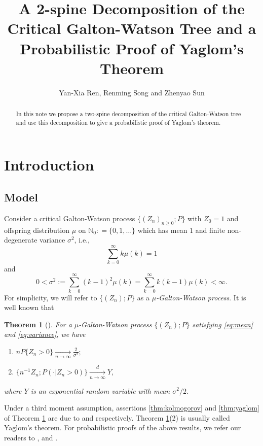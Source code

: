\documentclass[12pt,a4paper]{amsart}
\title[A 2-spine decomposition and Yaglom's theorem]
{\large A 2-spine Decomposition of the Critical Galton-Watson Tree and a Probabilistic Proof of Yaglom's Theorem}
\author{Yan-Xia Ren, Renming Song and Zhenyao Sun}
\newtheorem{thm}{Theorem}[section]
\numberwithin{equation}{section}
\begin{document}
\begin{abstract}
	In this note  we propose a two-spine decomposition of the critical Galton-Watson tree and use this decomposition to give a probabilistic proof of Yaglom's theorem.
\end{abstract}
\maketitle	
\section{Introduction}
\subsection{Model}
\label{sec:model}
	Consider a critical Galton-Watson process 
	$\{(Z_n)_{n\ge 0}; P \}$ with $Z_0 = 1$ 
	and offspring distribution $\mu$ on $\mathbb N_0 : = \{0,1,\dots\}$ which has mean $1$ and finite non-degenerate variance $\sigma^2$, i.e.,
\begin{equation}\label{eq:mean}
 \sum_{k=0}^\infty k \mu(k)	=1
\end{equation}
	and
\begin{equation}\label{eq:variance}
	0	
	<	\sigma^2
	:=	\sum_{k=0}^\infty  (k-1)^2 \mu(k)
	=	\sum_{k=0}^\infty k(k-1) \mu(k)
	<	\infty.
\end{equation}
	For simplicity, we will refer to $\{(Z_n); P\}$ as  a  \emph{$\mu$-Galton-Watson process}.
	It is well known that
\begin{thm}[\cite{kesten1966galton}] \label{thm: Kolmogrov and Yaglom theorem}
	For a $\mu$-Galton-Watson process $\{(Z_n); P\}$ satisfying \eqref{eq:mean} and \eqref{eq:variance}, we have
\begin{enumerate}
\item \label{thm:kolmogorov}
	$n P \{Z_n>0\} \xrightarrow[n \to \infty]{} \frac{2}{\sigma^2};$
\item \label{thm:yaglom}
	$\{n^{-1}Z_n; P(\cdot | Z_n>0)\}\xrightarrow[n \to \infty]{d} Y,$
\end{enumerate}
	where $Y$ is an exponential random variable with mean $\sigma^2/2$.
\end{thm}

	Under a third moment assumption, assertions \eqref{thm:kolmogorov} and \eqref{thm:yaglom} of Theorem \ref{thm: Kolmogrov and Yaglom theorem} are due to \cite{kolmogorov1938losung} and \cite{yaglom1947certain} respectively.
	Theorem \ref{thm: Kolmogrov and Yaglom theorem}(2) is usually called Yaglom's theorem.
	For probabilistic proofs of the above results, we refer our readers to
\cite{geiger1999elementary}, \cite{geiger2000new} and \cite{lyons1995conceptual}.
\end{document}
